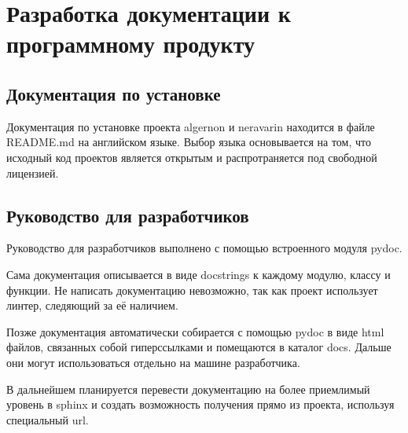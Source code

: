 \section{Разработка документации к программному продукту}

\tocless\subsection{Документация по установке}

Документация по установке проекта algernon и neravarin находится в файле README.md на английском языке.
Выбор языка основывается на том, что исходный код проектов является открытым и распротраняется под свободной лицензией.

\tocless\subsection{Руководство для разработчиков}

Руководство для разработчиков выполнено с помощью встроенного модуля pydoc.

Сама документация описывается в виде docstrings к каждому модулю, классу и функции. Не написать документацию невозможно, так как
проект использует линтер, следяющий за её наличием.

Позже документация автоматически собирается с помощью pydoc в виде html файлов, связанных собой гиперссылками и помещаются в каталог
docs. Дальше они могут использоваться отдельно на машине разработчика.

В дальнейшем планируется перевести документацию на более приемлимый уровень в sphinx и создать возможность получения прямо из проекта,
используя специальный url.
